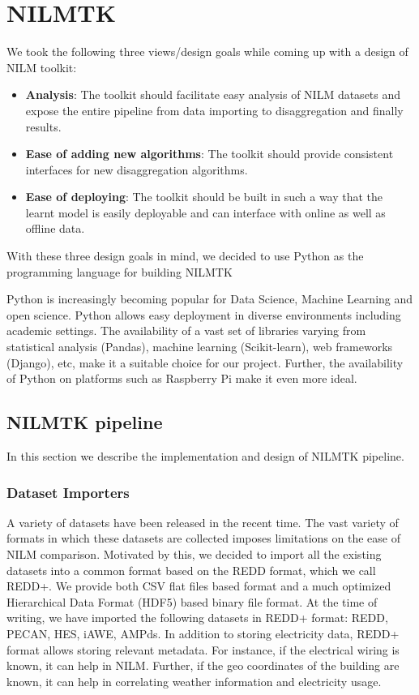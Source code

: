 \documentclass{sig-alternate}
\begin{document}
\section{NILMTK}
\label{sec:nilmtk}
We took the following three views/design goals while coming up with a design of NILM toolkit:
\begin{itemize}
\item \textbf{Analysis}: The toolkit should facilitate easy analysis of NILM datasets and expose the entire pipeline from
data importing to disaggregation and finally results. 
\item \textbf{Ease of adding new algorithms}: The toolkit should provide consistent interfaces for new disaggregation algorithms.
\item \textbf{Ease of deploying}: The toolkit should be built in such a way that the learnt model is easily deployable and can interface with online as well as offline data.
\end{itemize}
With these three design goals in mind, we decided to use Python as the programming language for building NILMTK

Python is increasingly becoming popular for Data Science, Machine Learning and open science. Python allows easy deployment in diverse environments including academic settings. The availability of a vast set of libraries varying from statistical analysis (Pandas), machine learning (Scikit-learn), web frameworks (Django), etc, make it a suitable choice for our project. Further, the availability of Python on platforms such as Raspberry Pi make it even more ideal.


\subsection{NILMTK pipeline}
In this section we describe the implementation and design of NILMTK pipeline. 
\subsubsection{Dataset Importers}A variety of datasets have been released in the recent time. The vast variety of formats in which these datasets are collected imposes limitations on the ease of NILM comparison. Motivated by this, we decided to import all the existing datasets into a common format based on the REDD format, which we call REDD+. We provide both CSV flat files based format and a much optimized Hierarchical Data Format (HDF5) based binary file format. At the time of writing, we have imported the following datasets in REDD+ format: REDD, PECAN, HES, iAWE, AMPds. In addition to storing electricity data, REDD+ format allows storing relevant metadata. For instance, if the electrical wiring is known, it can help in NILM. Further, if the geo coordinates of the building are known, it can help in correlating weather information and electricity usage.
\end{document}
